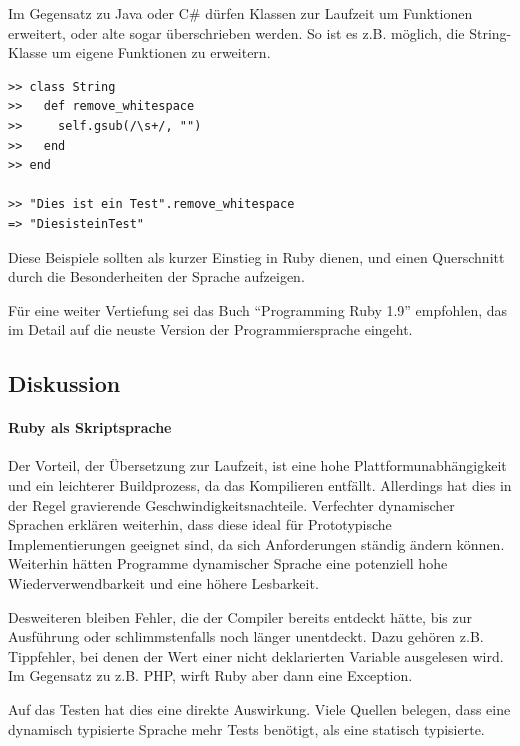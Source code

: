 Im Gegensatz zu Java oder C\# dürfen Klassen zur Laufzeit um Funktionen erweitert, oder alte sogar überschrieben werden. So ist es z.B. möglich, die String-Klasse um eigene Funktionen zu erweitern.

\begin{lstlisting}
>> class String
>>   def remove_whitespace
>>     self.gsub(/\s+/, "")
>>   end
>> end

>> "Dies ist ein Test".remove_whitespace
=> "DiesisteinTest"

\end{lstlisting}

Diese Beispiele sollten als kurzer Einstieg in Ruby dienen, und einen Querschnitt durch die Besonderheiten der Sprache aufzeigen.

Für eine weiter Vertiefung sei das Buch "`Programming Ruby 1.9"' empfohlen, das im Detail auf die neuste Version der Programmiersprache eingeht.

\subsection{Diskussion}

\paragraph{Ruby als Skriptsprache}
Der Vorteil, der Übersetzung zur Laufzeit, ist eine hohe Plattformunabhängigkeit und ein leichterer Buildprozess, da das Kompilieren entfällt. Allerdings hat dies in der Regel gravierende Geschwindigkeitsnachteile. 
Verfechter dynamischer Sprachen erklären weiterhin, dass diese ideal für Prototypische Implementierungen geeignet sind, da sich Anforderungen ständig ändern können. Weiterhin hätten Programme dynamischer Sprache eine potenziell hohe Wiederverwendbarkeit und eine höhere Lesbarkeit. 

Desweiteren bleiben Fehler, die der Compiler bereits entdeckt hätte, bis zur Ausführung oder schlimmstenfalls noch länger unentdeckt. Dazu gehören z.B. Tippfehler, bei denen der Wert einer nicht deklarierten Variable ausgelesen wird. Im Gegensatz zu z.B. PHP, wirft Ruby aber dann eine Exception.

Auf das Testen hat dies eine direkte Auswirkung. Viele Quellen belegen, dass eine dynamisch typisierte Sprache mehr Tests benötigt, als eine statisch typisierte. 



